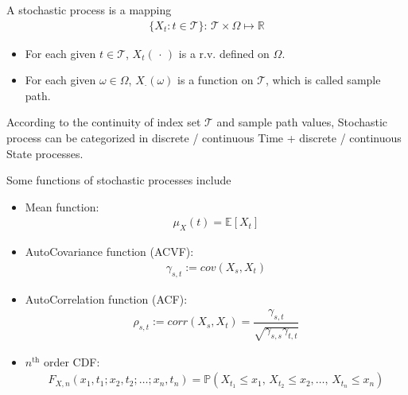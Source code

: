 A stochastic process is a mapping
\begin{align*}
     \{X_t:t\in\mathcal{T}\}:\, \mathcal{T}\times\Omega \mapsto \mathbb{R}
\end{align*}

\begin{itemize}[topsep=2pt,itemsep=0pt]
    \item For each given $ t \in\mathcal{T}$, $ X_t(\, \cdot \, ) $ is a r.v. defined on $ \Omega  $.
    \item For each given $ \omega \in \Omega  $, $ X_\cdot (\omega ) $ is a function on $ \mathcal{T} $, which is called sample path.
\end{itemize}

According to the continuity of index set $ \mathcal{T} $ and sample path values, Stochastic process can be categorized in discrete / continuous Time + discrete / continuous State processes.

Some functions of stochastic processes include
\begin{itemize}[topsep=2pt,itemsep=0pt]
    \item Mean function:
    \begin{align*}
        \mu _X(t)=\mathbb{E}\left[ X_t \right]  
    \end{align*}
    \item AutoCovariance function (ACVF):
    \begin{align*}
        \gamma _{s,t}:=cov(X_s,X_t)
    \end{align*}
    \item AutoCorrelation function (ACF):
    \begin{align*}
        \rho _{s,t}:=corr(X_s,X_t)=\dfrac{\gamma _{s,t}}{\sqrt{\gamma _{s,s}\gamma _{t,t}}} 
    \end{align*}
    \item $ n^\mathrm{th}  $ order CDF:
    \begin{align*}
        F_{X,n}(x_1,t_1;x_2,t_2;\ldots;x_n,t_n)=\mathbb{P}\left( X_{t_1}\leq x_1,\,X_{t_2}\leq x_2,\ldots,\,X_{t_n}\leq x_n \right)  
    \end{align*}
   
\end{itemize}



